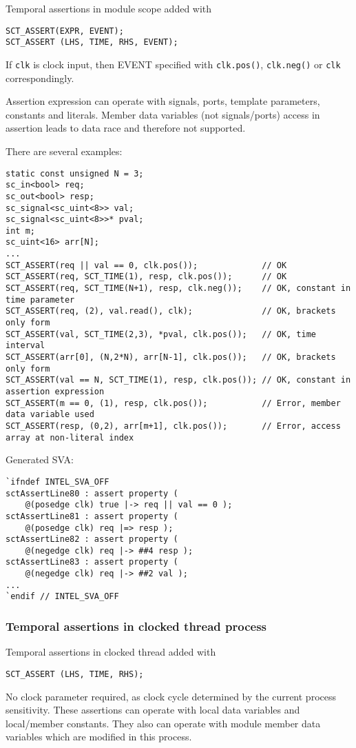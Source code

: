 Temporal assertions in module scope added with 

\begin{lstlisting}[style=mycpp]
SCT_ASSERT(EXPR, EVENT);
SCT_ASSERT (LHS, TIME, RHS, EVENT);
\end{lstlisting}
%
If {\tt clk} is clock input, then EVENT specified with {\tt clk.pos()}, {\tt clk.neg()} or {\tt clk} correspondingly. 

Assertion expression can operate with signals, ports, template parameters, constants and literals. Member data variables (not signals/ports) access in assertion leads to data race and therefore not supported. 

There are several examples:
\begin{lstlisting}[style=mycpp]
static const unsigned N = 3;
sc_in<bool> req;
sc_out<bool> resp;
sc_signal<sc_uint<8>> val;
sc_signal<sc_uint<8>>* pval;
int m;
sc_uint<16> arr[N];
...
SCT_ASSERT(req || val == 0, clk.pos());             // OK
SCT_ASSERT(req, SCT_TIME(1), resp, clk.pos());      // OK
SCT_ASSERT(req, SCT_TIME(N+1), resp, clk.neg());    // OK, constant in time parameter
SCT_ASSERT(req, (2), val.read(), clk);              // OK, brackets only form
SCT_ASSERT(val, SCT_TIME(2,3), *pval, clk.pos());   // OK, time interval
SCT_ASSERT(arr[0], (N,2*N), arr[N-1], clk.pos());   // OK, brackets only form
SCT_ASSERT(val == N, SCT_TIME(1), resp, clk.pos()); // OK, constant in assertion expression 
SCT_ASSERT(m == 0, (1), resp, clk.pos());           // Error, member data variable used
SCT_ASSERT(resp, (0,2), arr[m+1], clk.pos());       // Error, access array at non-literal index
\end{lstlisting}
%
Generated SVA:
\begin{lstlisting}[style=myverilog]
`ifndef INTEL_SVA_OFF
sctAssertLine80 : assert property (
    @(posedge clk) true |-> req || val == 0 );
sctAssertLine81 : assert property (
    @(posedge clk) req |=> resp );
sctAssertLine82 : assert property (
    @(negedge clk) req |-> ##4 resp );
sctAssertLine83 : assert property (
    @(negedge clk) req |-> ##2 val );
...
`endif // INTEL_SVA_OFF
\end{lstlisting}

\subsubsection{Temporal assertions in clocked thread process}

Temporal assertions in clocked thread added with 
\begin{lstlisting}[style=mycpp]
SCT_ASSERT (LHS, TIME, RHS);
\end{lstlisting}
%
No clock parameter required, as clock cycle determined by the current process sensitivity.
These assertions can operate with local data variables and local/member constants. They also can operate with module member data variables which are modified in this process.


